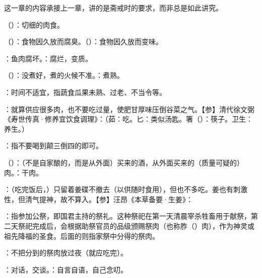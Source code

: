 {
这一章的内容承接上一章，讲的是斋戒时的要求，而非总是如此讲究。
\begin{lyitemize}
\item {}（）：切细的肉食。
\item {}（）：食物因久放而腐臭。（）：食物因久放而变味。

：鱼肉腐坏。：腐烂，变质。
\item {}（）：没煮好，煮的火候不准。：煮熟。

：时间不适宜，指蔬食瓜果未熟、过老、不当令等。
\item {}：就算供应很多肉，也不要吃过量，使肥甘厚味压倒谷菜之气。【参】清代徐文弼《寿世传真·修养宜饮食调理》：（茹：吃。匕：类似汤匙。箸（）：筷子。卫生：养生。）
\item {}：指不要喝到颠三倒四的即可。
\item {}（）：（不是自家酿的，而是从外面）买来的酒，从外面买来的（质量可疑的）肉。：干肉。
\item {}：（吃完饭后，）只留着姜碟不撤去（以供随时食用），但也不多吃。姜也有刺激性，但清气提神，故不算入。【参】汪昂《本草备要·生姜》：
\end{lyitemize}
}
{}


{
\item {}：指参加公祭，即国君主持的祭礼。这种祭祀在第一天清晨宰杀牲畜用于献祭，第二天祭祀完成后，会根据助祭官员的品级颁赐祭肉（也称胙（）肉），作为神灵或祖先降福的圣食。后面的则指家祭中分得的祭肉。
\item {}：不把分到的祭肉放过夜（就应吃完）。
}
{}


{
\item {}：对话，交谈。：自言自语，自己念叨。
}
{}


